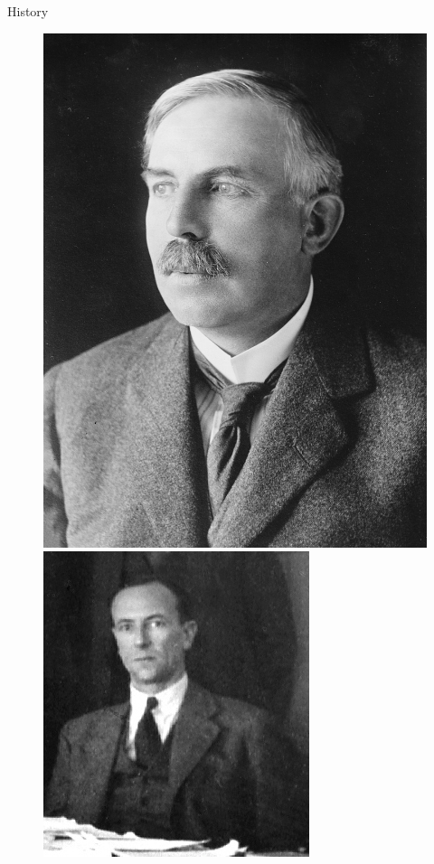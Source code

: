 \documentclass[10pt]{beamer}
\begin{document}
{\begin{frame}{History}
\begin{figure}
        \includegraphics[height=0.25\textheight]{figures/Rutherford.jpg}
        \includegraphics[height=0.25\textheight]{figures/Chadwick.jpg}

\end{figure}
\end{frame}}
\end{document}

